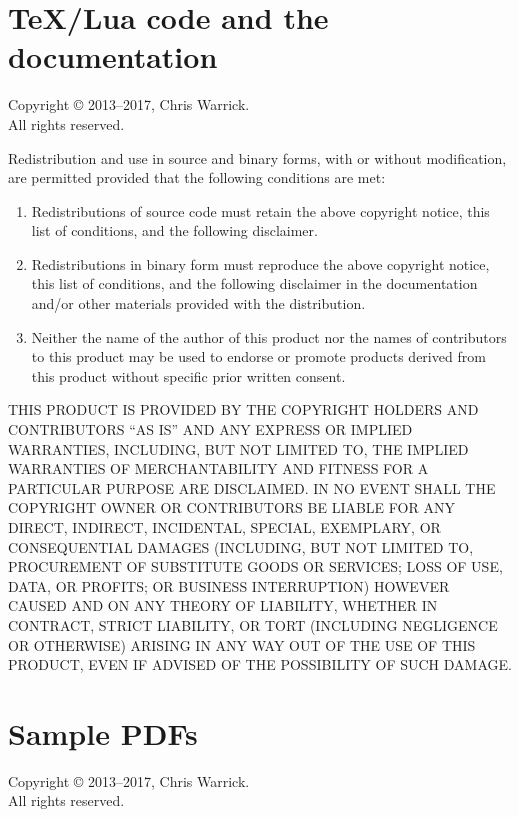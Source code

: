 \documentclass[a4paper,english]{report}
\numberwithin{equation}{section}
\begin{document}
\section{\TeX{}/Lua code and the documentation}

Copyright © 2013–2017, Chris Warrick.  \\
All rights reserved.

Redistribution and use in source and binary forms, with or without
modification, are permitted provided that the following conditions are
met:

\begin{enumerate}
\item Redistributions of source code must retain the above copyright
   notice, this list of conditions, and the following disclaimer.

\item Redistributions in binary form must reproduce the above copyright
   notice, this list of conditions, and the following disclaimer in the
   documentation and/or other materials provided with the distribution.

\item Neither the name of the author of this product nor the names of
   contributors to this product may be used to endorse or promote
   products derived from this product without specific prior written
   consent.
\end{enumerate}

THIS PRODUCT IS PROVIDED BY THE COPYRIGHT HOLDERS AND CONTRIBUTORS
“AS IS” AND ANY EXPRESS OR IMPLIED WARRANTIES, INCLUDING, BUT NOT
LIMITED TO, THE IMPLIED WARRANTIES OF MERCHANTABILITY AND FITNESS FOR
A PARTICULAR PURPOSE ARE DISCLAIMED.  IN NO EVENT SHALL THE COPYRIGHT
OWNER OR CONTRIBUTORS BE LIABLE FOR ANY DIRECT, INDIRECT, INCIDENTAL,
SPECIAL, EXEMPLARY, OR CONSEQUENTIAL DAMAGES (INCLUDING, BUT NOT
LIMITED TO, PROCUREMENT OF SUBSTITUTE GOODS OR SERVICES; LOSS OF USE,
DATA, OR PROFITS; OR BUSINESS INTERRUPTION) HOWEVER CAUSED AND ON ANY
THEORY OF LIABILITY, WHETHER IN CONTRACT, STRICT LIABILITY, OR TORT
(INCLUDING NEGLIGENCE OR OTHERWISE) ARISING IN ANY WAY OUT OF THE USE
OF THIS PRODUCT, EVEN IF ADVISED OF THE POSSIBILITY OF SUCH DAMAGE.

\pagebreak

\section{Sample PDFs}

Copyright © 2013–2017, Chris Warrick. \\
All rights reserved.
\end{document}
